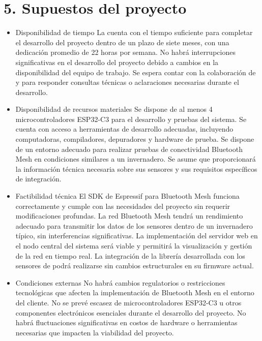 \documentclass[
11pt, %
]{charter}
\begin{document}
{\section{5. Supuestos del proyecto}
\label{sec:supuestos}

\begin{itemize}
\item Disponibilidad de tiempo
\subitem La \authorname cuenta con el tiempo suficiente para completar el desarrollo del proyecto dentro de un plazo de siete meses, con una dedicación promedio de 22 horas por semana. 
\subitem No habrá interrupciones significativas en el desarrollo del proyecto debido a cambios en la disponibilidad del equipo de trabajo.
\subitem Se espera contar con la colaboración de {\clientename} y {\empclientename} para responder consultas técnicas o aclaraciones necesarias durante el desarrollo.

\item Disponibilidad de recursos materiales
\subitem Se dispone de al menos 4 microcontroladores ESP32-C3 para el desarrollo y pruebas del sistema.
\subitem Se cuenta con acceso a herramientas de desarrollo adecuadas, incluyendo computadoras, compiladores, depuradores y hardware de prueba.
\subitem Se dispone de un entorno adecuado para realizar pruebas de conectividad Bluetooth Mesh en condiciones similares a un invernadero.
\subitem Se asume que {\empclientename} proporcionará la información técnica necesaria sobre sus sensores y sus requisitos específicos de integración.

\item Factibilidad técnica
\subitem El SDK de Espressif para Bluetooth Mesh funciona correctamente y cumple con las necesidades del proyecto sin requerir modificaciones profundas.
\subitem La red Bluetooth Mesh tendrá un rendimiento adecuado para transmitir los datos de los sensores dentro de un invernadero típico, sin interferencias significativas.
\subitem La implementación del servidor web en el nodo central del sistema será viable y permitirá la visualización y gestión de la red en tiempo real.
\subitem La integración de la librería desarrollada con los sensores de {\empclientename} podrá realizarse sin cambios estructurales en su firmware actual.

\item Condiciones externas
\subitem No habrá cambios regulatorios o restricciones tecnológicas que afecten la implementación de Bluetooth Mesh en el entorno del cliente.
\subitem No se prevé escasez de microcontroladores ESP32-C3 u otros componentes electrónicos esenciales durante el desarrollo del proyecto.
\subitem No habrá fluctuaciones significativas en costos de hardware o herramientas necesarias que impacten la viabilidad del proyecto.
\end{itemize}

}
\end{document}
